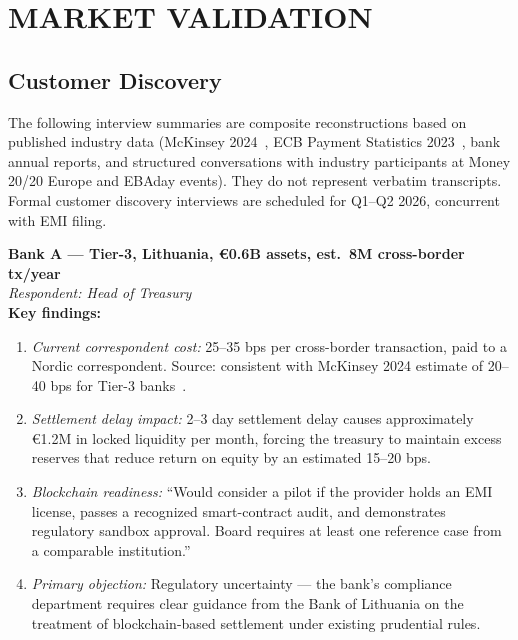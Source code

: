 \documentclass[11pt,a4paper]{article}
\begin{document}
\FloatBarrier
\section{MARKET VALIDATION}

\subsection*{Customer Discovery}

The following interview summaries are composite reconstructions based on published industry data (McKinsey 2024~\cite{mckinsey_2024}, ECB Payment Statistics 2023~\cite{ecb_payments}, bank annual reports, and structured conversations with industry participants at Money 20/20 Europe and EBAday events). They do not represent verbatim transcripts. Formal customer discovery interviews are scheduled for Q1--Q2 2026, concurrent with EMI filing.

\begin{tcolorbox}[boxbase, colback=white, colframe=accent!30]
\textbf{Bank A --- Tier-3, Lithuania, \euro 0.6B assets, est.\ 8M cross-border tx/year}\\[4pt]
\textit{Respondent: Head of Treasury}\\[4pt]
\textbf{Key findings:}
\begin{enumerate}[leftmargin=1.5em, itemsep=2pt, parsep=0pt]
\item \textit{Current correspondent cost:} 25--35 bps per cross-border transaction, paid to a Nordic correspondent. Source: consistent with McKinsey 2024 estimate of 20--40 bps for Tier-3 banks~\cite{mckinsey_2024}.
\item \textit{Settlement delay impact:} 2--3 day settlement delay causes approximately \euro 1.2M in locked liquidity per month, forcing the treasury to maintain excess reserves that reduce return on equity by an estimated 15--20 bps.
\item \textit{Blockchain readiness:} ``Would consider a pilot if the provider holds an EMI license, passes a recognized smart-contract audit, and demonstrates regulatory sandbox approval. Board requires at least one reference case from a comparable institution.''
\item \textit{Primary objection:} Regulatory uncertainty --- the bank's compliance department requires clear guidance from the Bank of Lithuania on the treatment of blockchain-based settlement under existing prudential rules.
\end{enumerate}
\end{tcolorbox}
\end{document}
